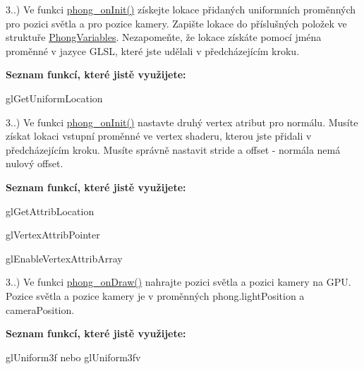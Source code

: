 \begin{DoxyRefList}
3..) Ve funkci \hyperlink{student_8h_ac2adb2ba4e748239b9db4d037584d3cc}{phong\-\_\-on\-Init()} získejte lokace přidaných uniformních proměnných pro pozici světla a pro pozice kamery. Zapište lokace do příslušných položek ve struktuře \hyperlink{structPhongVariables}{Phong\-Variables}. Nezapomeňte, že lokace získáte pomocí jména proměnné v jazyce G\-L\-S\-L, které jste udělali v předcházejícím kroku.\par
 {\bfseries Seznam funkcí, které jistě využijete\-:}
\begin{DoxyItemize}
\item gl\-Get\-Uniform\-Location 
\end{DoxyItemize}

3..) Ve funkci \hyperlink{student_8h_ac2adb2ba4e748239b9db4d037584d3cc}{phong\-\_\-on\-Init()} nastavte druhý vertex atribut pro normálu. Musíte získat lokaci vstupní proměnné ve vertex shaderu, kterou jste přidali v předcházejícím kroku. Musíte správně nastavit stride a offset -\/ normála nemá nulový offset.\par
 {\bfseries Seznam funkcí, které jistě využijete\-:}
\begin{DoxyItemize}
\item gl\-Get\-Attrib\-Location
\item gl\-Vertex\-Attrib\-Pointer
\item gl\-Enable\-Vertex\-Attrib\-Array 
\end{DoxyItemize}

3..) Ve funkci \hyperlink{student_8h_a53ffbb1a271d285abdaf7a029192f47e}{phong\-\_\-on\-Draw()} nahrajte pozici světla a pozici kamery na G\-P\-U. Pozice světla a pozice kamery je v proměnných phong.\-light\-Position a camera\-Position.\par
 {\bfseries Seznam funkcí, které jistě využijete\-:}
\begin{DoxyItemize}
\item gl\-Uniform3f nebo gl\-Uniform3fv 
\end{DoxyItemize}
\end{DoxyRefList}